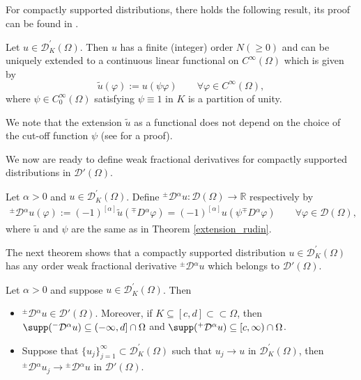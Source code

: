 \documentclass[leqno,final]{siamltex}
\numberwithin{equation}{section}
\renewcommand{\(}{\bigl(}
\renewcommand{\)}{\bigr)}
\newcommand{\R}{\mathbb{R}}
\begin{document}
For compactly supported distributions, there holds the following result, its proof can be 
found in \cite[Theorem 6.24]{Rudin}.

\begin{theorem}\label{extension_rudin}
	Let $u\in \mathscr{D}^\prime_K(\Omega)$. 
	Then $u$ has a finite (integer) order $N (\geq 0)$ and can be uniquely extended to a 
	continuous  linear functional on $C^\infty(\Omega)$ which is given by 
	\[
	\tilde{u}(\varphi) := u(\psi \varphi) \qquad \forall \varphi\in C^\infty(\Omega),
	\] 
	where $\psi\in C^\infty_0(\Omega)$ satisfying $\psi\equiv 1$ in $K$ is a partition of unity.
\end{theorem}

We note that the extension $\tilde{u}$ as a functional does not depend on the choice of 
the cut-off function $\psi$ (see \cite{Rudin} for a proof). 

We now are ready to define weak fractional derivatives for compactly supported distributions in $\mathscr{D}'(\Omega)$.

    \begin{definition}
        Let $ \alpha >0$ and  $u \in \mathscr{D}^\prime_K(\Omega)$. 
        Define ${^{\pm}}{\mathcal{D}}{^{\alpha}} u:\mathscr{D}(\Omega)\to \R$  respectively by  
        \begin{align*}
           {^{\pm}}{\mathcal{D}}{^{\alpha}} u  (\varphi):= (-1)^{[\alpha]} \tilde{u} ({^{\mp}}{D}{^{\alpha}} \varphi)   
                    = (-1)^{[\alpha]} u(\psi {^{\mp}}{D}{^{\alpha}} \varphi)   
           \qquad \forall \varphi \in \mathscr{D}(\Omega),
        \end{align*}
        where $\tilde{u}$ and $\psi$ are the same as in Theorem \ref{extension_rudin}. 
        
    \end{definition}
 
 The next theorem shows that a compactly supported distribution $u\in \mathscr{D}^\prime_K(\Omega)$ has 
 any order  weak fractional derivative ${^{\pm}}{\mathcal{D}}{^{\alpha}} u$ which belongs to $\mathscr{D}'(\Omega)$.
 
    \begin{theorem}\label{existence}
        Let $\alpha>0$ and suppose $u \in \mathscr{D}^\prime_K(\Omega)$. Then 
        \begin{itemize}
       \item [{\rm (i)}] ${^{\pm}}{\mathcal{D}}{^{\alpha}} u \in \mathscr{D}'(\Omega)$. Moreover, if $K \subseteq [c,d]\subset\subset\Omega$, then $\supp({^{-}}{\mathcal{D}}{^{\alpha}} u)\subseteq(-\infty, d]\cap \Omega$ and $\supp({^{+}}{\mathcal{D}}{^{\alpha}} u)\subseteq[c, \infty)\cap \Omega$.
       \item[{\rm (ii)}] Suppose that $\{ u_j\}_{j=1}^{\infty} \subset \mathscr{D}^\prime_K(\Omega)$
       such that 
        $u_j \rightarrow u$ in $\mathscr{D}^\prime_K(\Omega)$, then ${^{\pm}}{\mathcal{D}}{^{\alpha}} u_j \rightarrow {^{\pm}}{\mathcal{D}}{^{\alpha}} u$ in $\mathscr{D}'(\Omega)$.
        \end{itemize}
    \end{theorem}
\end{document}
